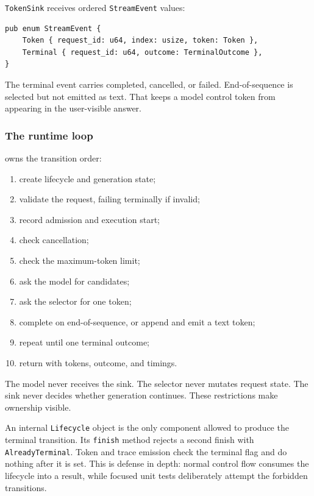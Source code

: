 \documentclass[
  10pt,
]{article}
\providecommand{\tightlist}{%
  \setlength{\itemsep}{0pt}\setlength{\parskip}{0pt}}
\begin{document}
\texttt{TokenSink} receives ordered \texttt{StreamEvent} values:

\begin{verbatim}
pub enum StreamEvent {
    Token { request_id: u64, index: usize, token: Token },
    Terminal { request_id: u64, outcome: TerminalOutcome },
}
\end{verbatim}

The terminal event carries completed, cancelled, or failed.
End-of-sequence is selected but not emitted as text. That keeps a model
control token from appearing in the user-visible answer.

\subsubsection{The runtime loop}\label{the-runtime-loop}

\texttt{} owns the transition order:

\begin{enumerate}
\def\labelenumi{\arabic{enumi}.}
\tightlist
\item
  create lifecycle and generation state;
\item
  validate the request, failing terminally if invalid;
\item
  record admission and execution start;
\item
  check cancellation;
\item
  check the maximum-token limit;
\item
  ask the model for candidates;
\item
  ask the selector for one token;
\item
  complete on end-of-sequence, or append and emit a text token;
\item
  repeat until one terminal outcome;
\item
  return \texttt{} with tokens, outcome, and
  timings.
\end{enumerate}

The model never receives the sink. The selector never mutates request
state. The sink never decides whether generation continues. These
restrictions make ownership visible.

An internal \texttt{Lifecycle} object is the only component allowed to
produce the terminal transition. Its \texttt{finish} method rejects a
second finish with \texttt{AlreadyTerminal}. Token and trace emission
check the terminal flag and do nothing after it is set. This is defense
in depth: normal control flow consumes the lifecycle into a result,
while focused unit tests deliberately attempt the forbidden transitions.
\end{document}

